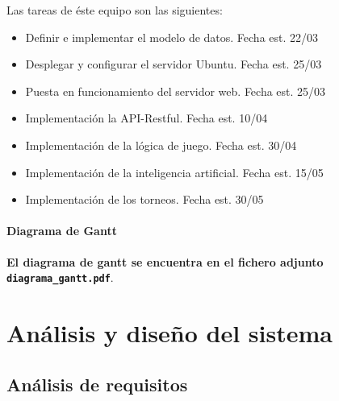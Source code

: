 \documentclass{article}
\begin{document}
Las tareas de éste equipo son las siguientes:
\begin{itemize}
    \item Definir e implementar el modelo de datos. Fecha est. 22/03
    \item Desplegar y configurar el servidor Ubuntu. Fecha est. 25/03
    \item Puesta en funcionamiento del servidor web. Fecha est. 25/03
    \item Implementación la API-Restful. Fecha est. 10/04
    \item Implementación de la lógica de juego. Fecha est. 30/04
    \item Implementación de la inteligencia artificial. Fecha est. 15/05
    \item Implementación de los torneos. Fecha est. 30/05
\end{itemize}


\paragraph{Diagrama de Gantt}
\textbf{El diagrama de gantt se encuentra en el fichero adjunto \texttt{diagrama\_gantt.pdf}}.

\section{Análisis y diseño del sistema}
\subsection{Análisis de requisitos}
\end{document}
